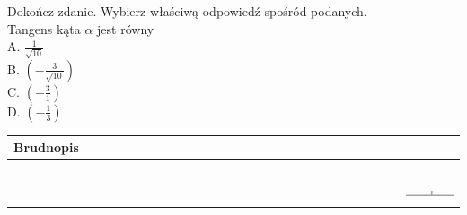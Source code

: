 \documentclass[10pt]{article}
\begin{document}
Dokończ zdanie. Wybierz właściwą odpowiedź spośród podanych.\\
Tangens kąta \(\alpha\) jest równy\\
A. \(\frac{1}{\sqrt{10}}\)\\
B. \(\left(-\frac{3}{\sqrt{10}}\right)\)\\
C. \(\left(-\frac{3}{1}\right)\)\\
D. \(\left(-\frac{1}{3}\right)\)

\begin{center}
\begin{tabular}{|c|c|c|c|c|c|c|c|c|c|c|c|c|c|c|c|c|c|c|c|c|c|c|c|c|c|c|c|c|c|c|}
\hline
\multicolumn{5}{|l|}{Brudnopis} &  &  &  &  &  &  &  &  &  &  &  &  &  &  &  &  &  &  &  &  &  &  &  &  &  &  \\
\hline
 &  &  &  &  &  &  &  &  &  &  &  &  &  &  &  &  &  &  &  &  &  &  &  &  &  &  &  &  &  &  \\
\hline
 &  &  &  &  &  &  &  &  &  &  &  &  &  &  &  &  &  &  &  &  &  &  &  &  &  &  &  &  &  &  \\
\hline
 &  &  &  &  &  &  &  &  &  &  &  &  &  &  &  &  &  &  &  &  &  &  &  &  &  &  &  &  &  &  \\
\hline
 &  &  &  &  &  &  &  &  &  &  &  &  &  &  &  &  &  &  &  &  &  &  &  &  &  &  &  &  &  &  \\
\hline
 &  &  &  &  &  &  &  &  &  &  &  &  &  &  &  &  &  &  &  &  &  &  &  &  &  &  &  &  &  &  \\
\hline
 &  &  &  &  &  &  &  &  &  &  &  &  &  &  &  &  &  &  &  &  &  &  &  &  &  &  &  &  &  & \includegraphics[max width=\textwidth]{2024_11_21_51cb67544fb9b029f01cg-17}
 \\
\hline
\end{tabular}
\end{center}
\end{document}
